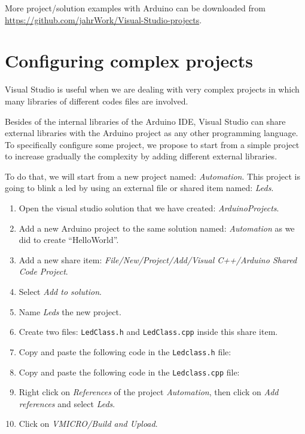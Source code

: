 \begin{IN}
    More project/solution examples with Arduino can be downloaded from \url{https://github.com/jahrWork/Visual-Studio-projects}.
\end{IN}

    \section{Configuring complex projects}
    
Visual Studio is useful when we  are dealing with very complex projects in which many libraries of different codes files are involved. 
	
Besides of the internal libraries of the Arduino IDE, Visual Studio can share external libraries with the Arduino project as any other programming language. 
To specifically configure some project, we propose to start from a simple project to increase gradually the complexity by adding different external libraries. 	

To do that, we will start from a new project named: \textit{Automation}. This project is going to blink a led by using an external file or shared item named: \textit{Leds}. 

\newpage
\begin{enumerate} 
	\item Open the visual studio solution that we have created: \textit{ArduinoProjects}. 
	\item Add a new Arduino project to the same solution named: \textit{Automation} as we did to create ``HelloWorld''.  
	\item Add a new share item:
	 \textit{File/New/Project/Add/Visual C++/Arduino Shared Code Project}.
	\item Select \textit{Add to solution}.
	\item Name \textit{Leds} the new project. 
	\item Create two files: \texttt{LedClass.h} and \texttt{LedClass.cpp} inside this share item. 
	\item Copy and paste the following code in the \texttt{Ledclass.h} file: 
	
	
	
	\item Copy and paste the following code in the  \texttt{Ledclass.cpp} file: 
	
	
	
	\item Right click on \textit{References} of the project \textit{Automation}, then click on \textit{Add references} and select \textit{Leds}.
	
    \item Click on \textit{VMICRO/Build and Upload}.
\end{enumerate} 

